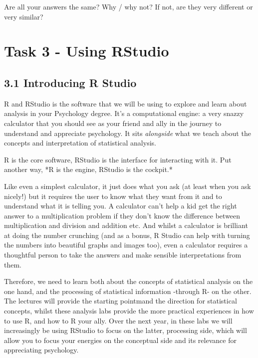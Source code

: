 \documentclass[
]{book}
\begin{document}
Are all your answers the same? Why / why not? If not, are they very different or very similar?

\hypertarget{task-3---using-rstudio}{%
\section{Task 3 - Using RStudio}\label{task-3---using-rstudio}}

\hypertarget{introducing-r-studio}{%
\subsection{3.1 Introducing R Studio}\label{introducing-r-studio}}

R and RStudio is the software that we will be using to explore and learn about analysis in your Psychology degree. It's a computational engine: a very snazzy calculator that you should see as your friend and ally in the journey to understand and appreciate psychology. It sits \emph{alongside}
what we teach about the concepts and interpretation of statistical analysis.

R is the core software, RStudio is the interface for interacting with it. Put another way, *R is the engine, RStudio is the cockpit.*

Like even a simplest calculator, it just does what you ask (at least when you ask nicely!) but it requires the user to know what they want from it and to understand what it is telling you. A calculator can't help a kid get the right answer to a multiplication problem if they don't know the difference between multiplication and division and addition etc. And whilst a calculator is brilliant at doing the number crunching (and as a bonus, R Studio can help with turning the numbers
into beautiful graphs and images too), even a calculator requires a thoughtful person to take the answers and make sensible interpretations from them.

Therefore, we need to learn both about the concepts of statistical analysis on the one hand, and the processing of statistical information -through R- on the other. The lectures will provide the starting pointmand the direction for statistical concepts, whilst these analysis labs provide the more practical experiences in how to use R, and how to R
your ally. Over the next year, in these labs we will increasingly be using RStudio to focus on the latter, processing side, which will allow you to focus your energies on the conceptual side and its relevance for appreciating psychology.
\end{document}
